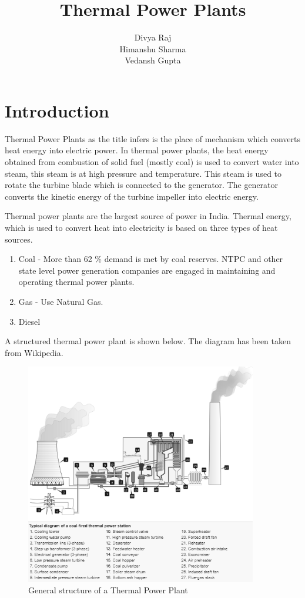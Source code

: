 \documentclass{report}
\title{\textbf{\Huge Thermal Power Plants} }
\author{Divya Raj \bullet 1610110123 \\ Himanshu Sharma \bullet 1610110149 \\ Vedansh Gupta \bullet 1610110429}
\date{}
\begin{document}
\maketitle
\tableofcontents
\newpage
\renewcommand{\thesection}{\arabic{section}}
\section{Introduction}
Thermal Power Plants as the title infers is the place of mechanism which converts heat energy into electric power. In thermal power plants, the heat energy obtained from combustion of solid fuel (mostly coal) is used to convert water into steam, this steam is at high pressure and temperature. This steam is used to rotate the turbine blade which is connected to the generator. The generator converts the kinetic energy of the turbine impeller into electric energy.
\par Thermal power plants are the largest source of power in India. Thermal energy, which is used to convert heat into electricity is based on three types of heat sources.
\begin{enumerate}
\item{Coal - More than 62 \% demand is met by coal reserves. NTPC and other state level power generation companies are engaged in maintaining and operating thermal power plants.}
\item{Gas - Use Natural Gas.}
\item{Diesel}
\end{enumerate}
A structured thermal power plant is shown below. The diagram has been taken from Wikipedia.

\begin{figure}[H]
\centering \includegraphics[width=0.9\textwidth]{images/tpp1.png}
\caption{General structure of a Thermal Power Plant}
\end{figure}
\end{document}
